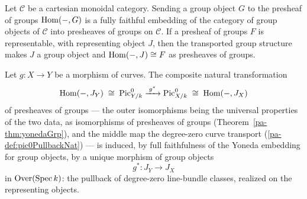 \begin{theorem}
  \label{pa-thm:yonedaGrp}
  \mathlibok
  \leanok

  Let \(\mathcal C\) be a cartesian monoidal category. Sending a group object
  \(G\) to the presheaf of groups \(\operatorname{Hom}(-, G)\) is a fully faithful embedding
  of the category of group objects of \(\mathcal C\) into presheaves of groups
  on \(\mathcal C\). If a presheaf of groups \(F\) is representable, with
  representing object \(J\), then the transported group structure makes \(J\)
  a group object and \(\operatorname{Hom}(-, J) \cong F\) as presheaves of groups.
\end{theorem}

\begin{definition}
  \label{pa-def:jacobian_data_pullbackHom}
  \leanok

  Let \(g \colon X \to Y\) be a morphism of curves. The composite natural
  transformation
  \[
    \operatorname{Hom}(-, J_Y) \;\cong\; \operatorname{Pic}^0_{Y/k}
    \xrightarrow{\;g^{*}\;} \operatorname{Pic}^0_{X/k} \;\cong\; \operatorname{Hom}(-, J_X)
  \]
  of presheaves of groups --- the outer isomorphisms being the universal
  properties of the two data, as isomorphisms of presheaves of groups
  (Theorem~\ref{pa-thm:yonedaGrp}), and the middle map the degree-zero curve
  transport (\ref{pa-def:pic0PullbackNat}) --- is induced, by full faithfulness
  of the Yoneda embedding for group objects, by a unique morphism of group
  objects
  \[
    g^{*} \colon J_Y \longrightarrow J_X
  \]
  in \(\mathrm{Over}(\operatorname{Spec} k)\): the pullback of degree-zero line-bundle classes,
  realized on the representing objects.
\end{definition}

